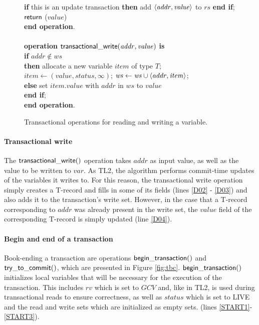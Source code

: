 \documentclass[11pt,letterpaper]{article}
\begin{document}
\begin{figure}
{{\begin{minipage}[t]{150mm}
\begin{tabbing}
 \> {\bf if} this is an update transaction 
                        {\bf then} add $\left \langle \mathit{addr,value} \right \rangle $ to $\mathit{rs}$ {\bf end if}; \\
 \> ${\sf return}$ ($\mathit{value}$) \\
{\bf end operation}. \\
\\
{\bf operation}  ${\sf transactional\_write}(\mathit{addr, value})$ {\bf is}\\
 \> {\bf if} $\mathit{addr} \not\in \mathit{ws}$  \\
 \>\> {\bf then} \> allocate a new variable $item$ of type $T$; \\
 \>\>\> $\mathit{item}  \gets (\mathit{value, status, \infty})$; 
                   $\mathit{ws} \gets \mathit{ws} \cup \left \langle \mathit{addr, item} \right \rangle $; \\
 \>\> {\bf else} \> set $\mathit{item.value}$ with $\mathit{addr}$ in $\mathit{ws}$ to $\mathit{value}$ \\
 \> {\bf end if}; \\
{\bf end operation}.
\end{tabbing}
\normalsize
\end{minipage}
}
\caption{Transactional operations for reading and writing a variable.}
\label{fig:tops}
}
\end{figure}

\paragraph{Transactional write}
The ${\sf transactional\_write()}$ operation
takes $\mathit{addr}$ as input value, as well as the value 
to be written to $\mathit{var}$. As  TL2, the algorithm 
performs commit-time updates of the variables it writes to. 
For this reason, the transactional write  
operation simply creates a T-record and fills in some of its 
fields (lines \ref{D02} - \ref{D03}) and also 
adds it to the transaction{}'s write set.
However, in the case that a T-record corresponding to $\mathit{addr}$  was
already present in  the write set, the
$\mathit{value}$ field of the corresponding  
T-record is simply updated (line \ref{D04}).


\paragraph{Begin and end of a transaction} 
Book-ending a transaction are operations ${\sf begin\_transaction()}$ 
and ${\sf try\_to\_commit()}$, which are 
presented in Figure \ref{fig:tbc}. ${\sf begin\_transaction()}$ 
initializes local variables that will be necessary 
for the execution of the transaction.
This includes $\mathit{rv}$
which is set to $\mathit{GCV}$ and, like in TL2, is used during transactional
reads to ensure correctness, 
as well as $\mathit{status}$ which is set to LIVE and the read and write sets
which are initialized as empty sets.
(lines \ref{START1}-\ref{START3}). 
\end{document}
